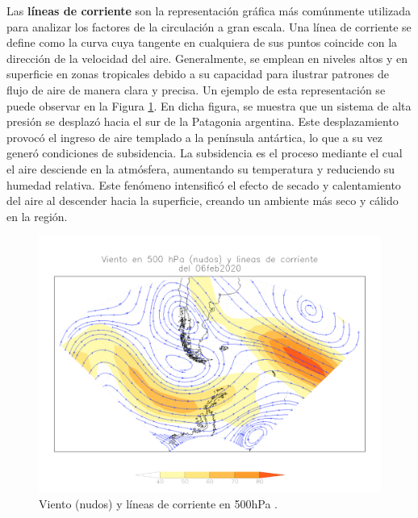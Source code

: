 Las \textbf{líneas de corriente} \cite{recordAntarticos2024} son la representación gráfica más comúnmente utilizada para analizar los factores de la circulación a gran escala. Una línea de corriente se define como la curva cuya tangente en cualquiera de sus puntos coincide con la dirección de la velocidad del aire. Generalmente, se emplean en niveles altos y en superficie en zonas tropicales debido a su capacidad para ilustrar patrones de flujo de aire de manera clara y precisa. Un ejemplo de esta representación se puede observar en la Figura \ref{fig:mapaLineas}. En dicha figura, se muestra que un sistema de alta presión se desplazó hacia el sur de la Patagonia argentina. Este desplazamiento provocó el ingreso de aire templado a la península antártica, lo que a su vez generó condiciones de subsidencia. La subsidencia es el proceso mediante el cual el aire desciende en la atmósfera, aumentando su temperatura y reduciendo su humedad relativa. Este fenómeno intensificó el efecto de secado y calentamiento del aire al descender hacia la superficie, creando un ambiente más seco y cálido en la región.


\begin{figure}[H]
    \centering
    \includegraphics[width=1\linewidth]{Figuras/viento/mapalineasViento.png}
    \caption{Viento (nudos) y líneas de corriente en 500\unit{\hecto\pascal} \cite{recordAntarticos2024}.}
    \label{fig:mapaLineas}
\end{figure}


